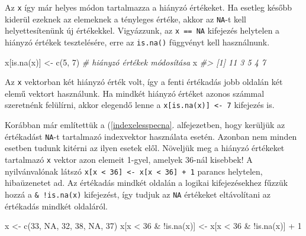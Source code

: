 \documentclass[
]{book}
\newenvironment{Shaded}{\begin{snugshade}}{\end{snugshade}}
\newcommand{\CommentTok}[1]{\textcolor[rgb]{0.56,0.35,0.01}{\textit{#1}}}
\newcommand{\ConstantTok}[1]{\textcolor[rgb]{0.00,0.00,0.00}{#1}}
\newcommand{\DecValTok}[1]{\textcolor[rgb]{0.00,0.00,0.81}{#1}}
\newcommand{\FunctionTok}[1]{\textcolor[rgb]{0.00,0.00,0.00}{#1}}
\newcommand{\NormalTok}[1]{#1}
\newcommand{\OtherTok}[1]{\textcolor[rgb]{0.56,0.35,0.01}{#1}}
\newcommand{\SpecialCharTok}[1]{\textcolor[rgb]{0.00,0.00,0.00}{#1}}
\begin{document}
Az \texttt{x} így már helyes módon tartalmazza a hiányzó értékeket. Ha esetleg később kiderül ezeknek az elemeknek a tényleges értéke, akkor az \texttt{NA}-t kell helyettesítenünk új értékekkel. Vigyázzunk, az \texttt{x\ ==\ NA} kifejezés helytelen a hiányzó értékek tesztelésére, erre az \texttt{is.na()} függvényt kell használnunk.

\begin{Shaded}
\begin{Highlighting}[]
\NormalTok{x[}\FunctionTok{is.na}\NormalTok{(x)] }\OtherTok{\textless{}{-}} \FunctionTok{c}\NormalTok{(}\DecValTok{5}\NormalTok{, }\DecValTok{7}\NormalTok{)    }\CommentTok{\# hiányzó értékek módosítása}
\NormalTok{x}
\CommentTok{\#\textgreater{} [1] 11  3  5  4  7}
\end{Highlighting}
\end{Shaded}

Az \texttt{x} vektorban két hiányzó érték volt, így a fenti értékadás jobb oldalán két elemű vektort használunk. Ha mindkét hiányzó értéket azonos számmal szeretnénk felülírni, akkor elegendő lenne a \texttt{x{[}is.na(x){]}\ \textless{}-\ 7} kifejezés is.

Korábban már említettük a (\ref{indexelesspecna}. alfejezetben, hogy kerüljük az értékadást \texttt{NA}-t tartalmazó indexvektor használata esetén. Azonban nem minden esetben tudunk kitérni az ilyen esetek elől. Növeljük meg a hiányzó értékeket tartalmazó \texttt{x} vektor azon elemeit 1-gyel, amelyek 36-nál kisebbek! A nyilvánvalónak látszó \texttt{x{[}x\ \textless{}\ 36{]}\ \textless{}-\ x{[}x\ \textless{}\ 36{]}\ +\ 1} parancs helytelen, hibaüzenetet ad. Az értékadás mindkét oldalán a logikai kifejezésekhez fűzzük hozzá a \texttt{\&\ !is.na(x)} kifejezést, így tudjuk az \texttt{NA} értékeket eltávolítani az értékadás mindkét oldaláról.

\begin{Shaded}
\begin{Highlighting}[]
\NormalTok{x }\OtherTok{\textless{}{-}} \FunctionTok{c}\NormalTok{(}\DecValTok{33}\NormalTok{, }\ConstantTok{NA}\NormalTok{, }\DecValTok{32}\NormalTok{, }\DecValTok{38}\NormalTok{, }\ConstantTok{NA}\NormalTok{, }\DecValTok{37}\NormalTok{)}
\NormalTok{x[x }\SpecialCharTok{\textless{}} \DecValTok{36} \SpecialCharTok{\&} \SpecialCharTok{!}\FunctionTok{is.na}\NormalTok{(x)] }\OtherTok{\textless{}{-}}\NormalTok{ x[x }\SpecialCharTok{\textless{}} \DecValTok{36} \SpecialCharTok{\&} \SpecialCharTok{!}\FunctionTok{is.na}\NormalTok{(x)] }\SpecialCharTok{+} \DecValTok{1}
\end{Highlighting}
\end{Shaded}
\end{document}

